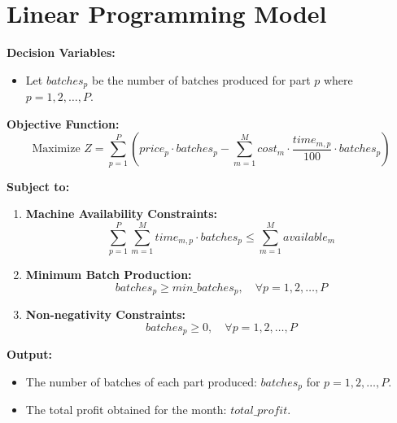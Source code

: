 \documentclass{article}
\begin{document}
\section*{Linear Programming Model}

\textbf{Decision Variables:}
\begin{itemize}
    \item Let \( batches_{p} \) be the number of batches produced for part \( p \) where \( p = 1, 2, \ldots, P \).
\end{itemize}

\textbf{Objective Function:}
\[
\text{Maximize } Z = \sum_{p=1}^{P} \left( price_{p} \cdot batches_{p} - \sum_{m=1}^{M} cost_{m} \cdot \frac{time_{m,p}}{100} \cdot batches_{p} \right)
\]

\textbf{Subject to:}

\begin{enumerate}
    \item \textbf{Machine Availability Constraints:}
    \[
    \sum_{p=1}^{P} \sum_{m=1}^{M} time_{m,p} \cdot batches_{p} \leq \sum_{m=1}^{M} available_{m}
    \]

    \item \textbf{Minimum Batch Production:}
    \[
    batches_{p} \geq min\_batches_{p}, \quad \forall p = 1, 2, \ldots, P
    \]

    \item \textbf{Non-negativity Constraints:}
    \[
    batches_{p} \geq 0, \quad \forall p = 1, 2, \ldots, P
    \]
\end{enumerate}

\textbf{Output:}
\begin{itemize}
    \item The number of batches of each part produced: \( batches_{p} \) for \( p = 1, 2, \ldots, P \).
    \item The total profit obtained for the month: \( total\_profit \).
\end{itemize}
\end{document}
